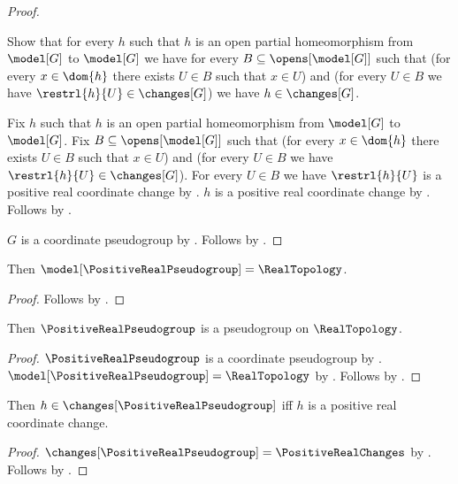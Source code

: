 \begin{proof}
\begin{subproof}
    \end{subproof}
    Show that for every $h$ such that $h$ is an open partial homeomorphism
        from $\model[G]$ to $\model[G]$ we have
        for every $B\subseteq\opens[\model[G]]$ such that
            (for every $x\in\dom{h}$ there exists $U\in B$ such that $x\in U$) and
            (for every $U\in B$ we have $\restrl{h}{U}\in\changes[G]$)
        we have $h\in\changes[G]$.
    \begin{subproof}
        Fix $h$ such that $h$ is an open partial homeomorphism
            from $\model[G]$ to $\model[G]$.
        Fix $B\subseteq\opens[\model[G]]$ such that
            (for every $x\in\dom{h}$ there exists $U\in B$ such that $x\in U$) and
            (for every $U\in B$ we have $\restrl{h}{U}\in\changes[G]$).
        For every $U\in B$ we have $\restrl{h}{U}$ is a positive real coordinate change
            by .
        $h$ is a positive real coordinate change by .
        Follows by .
    \end{subproof}
    $G$ is a coordinate pseudogroup by .
    Follows by .
\end{proof}

\begin{theorem}\label{positive_real_pseudogroup_model}
    Then $\model[\PositiveRealPseudogroup]=\RealTopology$.
\end{theorem}
\begin{proof}
    Follows by .
\end{proof}

\begin{classification}\label{positive_real_pseudogroup_on}
    Then $\PositiveRealPseudogroup$ is a pseudogroup on $\RealTopology$.
\end{classification}
\begin{proof}
    $\PositiveRealPseudogroup$ is a coordinate pseudogroup by .
    $\model[\PositiveRealPseudogroup]=\RealTopology$ by .
    Follows by .
\end{proof}

\begin{theorem}\label{positive_real_pseudogroup_changes}
    Then $h\in\changes[\PositiveRealPseudogroup]$ iff
        $h$ is a positive real coordinate change.
\end{theorem}
\begin{proof}
    $\changes[\PositiveRealPseudogroup]=\PositiveRealChanges$ by
        .
    Follows by .
\end{proof}

